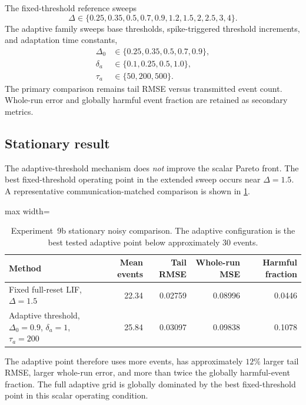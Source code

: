 The fixed-threshold reference sweeps
\begin{equation}
  \Delta\in\{0.25,0.35,0.5,0.7,0.9,1.2,1.5,2,2.5,3,4\}.
\end{equation}
The adaptive family sweeps base thresholds, spike-triggered threshold increments, and adaptation time constants,
\begin{align}
  \Delta_0 &\in \{0.25,0.35,0.5,0.7,0.9\},\\
  \delta_a &\in \{0.1,0.25,0.5,1.0\},\\
  \tau_a &\in \{50,200,500\}.
\end{align}
The primary comparison remains tail RMSE versus transmitted event count. Whole-run error and globally harmful event fraction are retained as secondary metrics.

\subsection{Stationary result}

The adaptive-threshold mechanism does \emph{not} improve the scalar Pareto front. The best fixed-threshold operating point in the extended sweep occurs near $\Delta=1.5$. A representative communication-matched comparison is shown in \cref{tab:exp9b-stationary}.

\begin{table}[ht]
\centering
\caption{Experiment~9b stationary noisy comparison. The adaptive configuration is the best tested adaptive point below approximately 30 events.}
\label{tab:exp9b-stationary}
\begin{adjustbox}{max width=\textwidth}
\begin{tabular}{lrrrr}
\toprule
Method & Mean events & Tail RMSE & Whole-run MSE & Harmful fraction\\
\midrule
Fixed full-reset LIF, $\Delta=1.5$ & 22.34 & 0.02759 & 0.08996 & 0.0446\\
Adaptive threshold, $\Delta_0=0.9$, $\delta_a=1$, $\tau_a=200$ & 25.84 & 0.03097 & 0.09838 & 0.1078\\
\bottomrule
\end{tabular}
\end{adjustbox}
\end{table}

The adaptive point therefore uses more events, has approximately $12\%$ larger tail RMSE, larger whole-run error, and more than twice the globally harmful-event fraction. The full adaptive grid is globally dominated by the best fixed-threshold point in this scalar operating condition.

